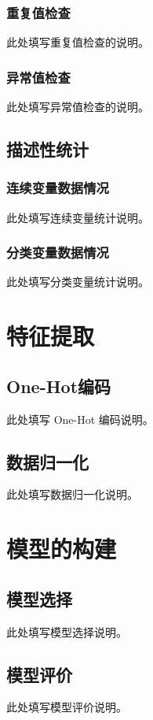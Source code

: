 \documentclass[12pt,a4paper,UTF8]{ctexart}
\begin{document}
\subsubsection{重复值检查}
此处填写重复值检查的说明。

\subsubsection{异常值检查}
此处填写异常值检查的说明。

\subsection{描述性统计}

\subsubsection{连续变量数据情况}
此处填写连续变量统计说明。

\subsubsection{分类变量数据情况}
此处填写分类变量统计说明。

\section{特征提取}

\subsection{One-Hot编码}
此处填写 One-Hot 编码说明。

\subsection{数据归一化}
此处填写数据归一化说明。

\section{模型的构建}

\subsection{模型选择}
此处填写模型选择说明。

\subsection{模型评价}
此处填写模型评价说明。
\end{document}
